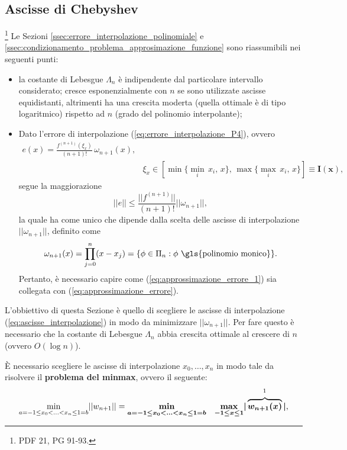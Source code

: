 \subsection{Ascisse di Chebyshev}\label{ssec:ascisse_chebyshev}\footnote{PDF 21, PG 91-93.}
Le Sezioni \ref{ssec:errore_interpolazione_polinomiale} e \ref{ssec:condizionamento_problema_approsimazione_funzione} sono riassumibili nei seguenti punti:
\begin{itemize}
    \item la costante di Lebesgue $\Lambda_n$ è indipendente dal particolare intervallo considerato; cresce esponenzialmente con $n$ se sono utilizzate ascisse equidistanti, altrimenti ha una crescita moderta (quella ottimale è di tipo logaritmico) rispetto ad $n$ (grado del polinomio interpolante);
    \item Dato l'errore di interpolazione (\ref{eq:errore_interpolazione_P4}), ovvero 
    \begin{equation*}
    	\begin{matrix}
    		e(x)=\frac{f^{(n+1)}(\xi_x)}{(n+1)!}\,\omega_{n+1}(x),&\\
    		&\xi_x\in[\min\{\underset{i}{\min}\,x_i,\,x\},\, \max\{\underset{i}{\max}\,x_i,\, x\}]\boldsymbol{\equiv I(x)},
    	\end{matrix}
    \end{equation*}
    segue la maggiorazione 
    \begin{equation}\label{eq:approssimazione_errore_1}
    	||e||\leq \frac{||f^{(n+1)}||}{(n+1)!}||\omega_{n+1}||,
    \end{equation}
    la quale ha come unico che dipende dalla scelta delle ascisse di interpolazione $||\omega_{n+1}||$, definito come
    \begin{equation*}
    	\omega_{n+1}(x)=\prod_{j=0}^n(x-x_j) = \{\phi\in\Pi_n: \phi \text{ \gls{polinomio monico}}\}.
    \end{equation*}
    Pertanto, è necessario capire come (\ref{eq:approssimazione_errore_1}) sia collegata con (\ref{eq:approssimazione_errore}). 
\end{itemize}

L'obbiettivo di questa Sezione è quello di scegliere le ascisse di interpolazione (\ref{eq:ascisse_interpolazione}) in modo da minimizzare $||\omega_{n+1}||$. Per fare questo è necessario che la costante di Lebesgue $\Lambda_n$ abbia crescita ottimale al crescere di $n$ (ovvero $O(\log n)$).

È necessario scegliere le ascisse di interpolazione $x_0,\hdots,x_n$ in modo tale da risolvere il \textbf{problema del minmax}, ovvero il seguente: \footnotemark
\begin{equation}\label{eq:minmax}
    \underset{a=-1\leq x_0<\hdots<x_n\leq 1=b}{\min}||w_{n+1}||=\boldsymbol{\underset{a=-1\leq x_0<\hdots<x_n\leq 1=b}{\min}\quad\underset{-1\leq x\leq 1}{\max}|}\overbrace{\boldsymbol{w_{n+1}(x)}}^{\footnotemark}\boldsymbol|,
\end{equation}
\addtocounter{footnote}{-1}

